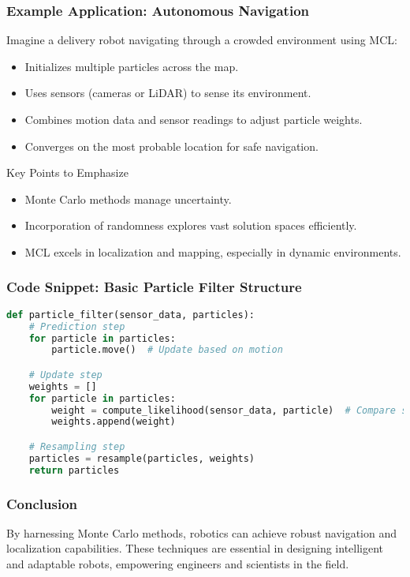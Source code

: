 \documentclass[aspectratio=169]{beamer}
\begin{document}
\begin{frame}[fragile]
    \frametitle{Example Application: Autonomous Navigation}
    Imagine a delivery robot navigating through a crowded environment using MCL:
    \begin{itemize}
        \item Initializes multiple particles across the map.
        \item Uses sensors (cameras or LiDAR) to sense its environment.
        \item Combines motion data and sensor readings to adjust particle weights.
        \item Converges on the most probable location for safe navigation.
    \end{itemize}
    
    \begin{block}{Key Points to Emphasize}
        \begin{itemize}
            \item Monte Carlo methods manage uncertainty.
            \item Incorporation of randomness explores vast solution spaces efficiently.
            \item MCL excels in localization and mapping, especially in dynamic environments.
        \end{itemize}
    \end{block}
\end{frame}

\begin{frame}[fragile]
    \frametitle{Code Snippet: Basic Particle Filter Structure}
    \begin{lstlisting}[language=Python]
def particle_filter(sensor_data, particles):
    # Prediction step
    for particle in particles:
        particle.move()  # Update based on motion

    # Update step
    weights = []
    for particle in particles:
        weight = compute_likelihood(sensor_data, particle)  # Compare sensor readings
        weights.append(weight)

    # Resampling step
    particles = resample(particles, weights)
    return particles
    \end{lstlisting}
\end{frame}

\begin{frame}[fragile]
    \frametitle{Conclusion}
    By harnessing Monte Carlo methods, robotics can achieve robust navigation and localization capabilities. These techniques are essential in designing intelligent and adaptable robots, empowering engineers and scientists in the field.
\end{frame}
\end{document}
